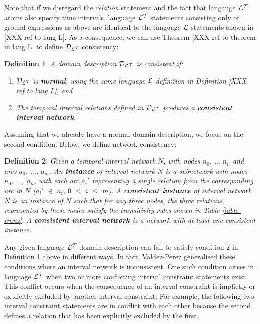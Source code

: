 \documentclass[11pt]{report}
\newtheorem{vdefinition}{Definition}[chapter]
\begin{document}
      Note that if we disregard the {\em relation} statement and the fact
      that langauge ${\cal L^T}$ atoms also specify time intervals, language
      ${\cal L^T}$ statements consisting only of ground expressions as above
      are identical to the language ${\cal L}$ statements shown in [XXX ref to
      lang L]. As a consequence, we can use Theorem [XXX ref to theorem in
      lang L] to define ${\cal D_{L^T}}$ consistency:

      \begin{vdefinition}
        \label{def-cons1}
        A domain description ${\cal D_{L^T}}$ is consistent if:

        \begin{enumerate}
          \item
            ${\cal D_{L^T}}$ is {\bf normal}, using the same language
            ${\cal L}$ definition in Definition [XXX ref to lang L], and

          \item
            The temporal interval relations defined in ${\cal D_{L^T}}$
            produces a {\bf consistent interval network}.
        \end{enumerate}
      \end{vdefinition}

      Assuming that we already have a normal domain description, we focus on
      the second condition. Below, we define network consistency:

      \begin{vdefinition}
        \label{def-cons2}
        Given a temporal interval network $N$, with nodes $n_0$,
        $\ldots$ $n_n$ and arcs $a_0$, $\ldots$, $a_m$. An {\bf instance} of
        interval network $N$ is a subnetwork with nodes $n_0$, $\ldots$, $n_n$,
        with each arc $a_{i}'$ representing a single relation from the
        corresponding arc in $N$ ($a_{i}'$ $\in$ $a_i$, $0$ $\leq$ $i$ $\leq$
        $m$). A {\bf consistent instance} of interval network $N$ is an
        instance of $N$ such that for any three nodes, the three relations
        represented by these nodes satisfy the transitivity rules shown in
        Table \ref{table-trans}. A {\bf consistent interval network} is a
        network with at least one consistent instance.
      \end{vdefinition}

      Any given language ${\cal L^T}$ domain description can fail to satisfy
      condition 2 in Definition \ref{def-cons1} above in different ways. In
      fact, Valdez-Perez \cite{VP} generalised these conditions where an
      interval network is inconsistent\footnotemark.
      One such condition arises in language ${\cal L^T}$ when two or more
      conflicting interval constraint statements exist. This conflict occurs
      when the consequence of an interval constraint is implictly or explicitly
      excluded by another interval constraint. For example, the following two
      interval constraint statements are in conflict with each other because
      the second defines a relation that has been explicitly excluded by the
      first.
\end{document}
